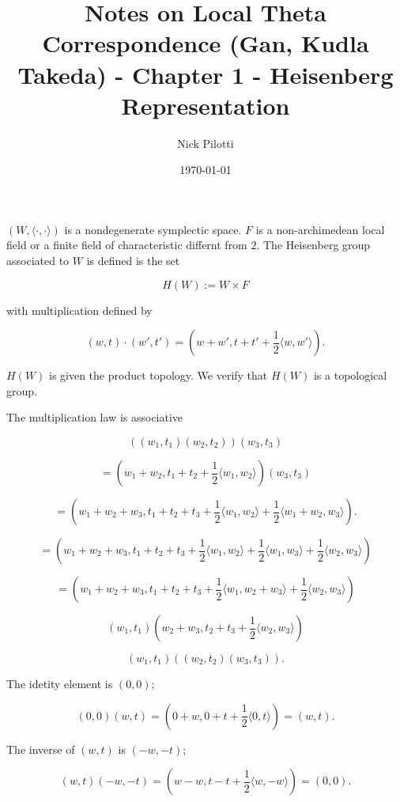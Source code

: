 \documentclass[12pt]{article}
\title{Notes on Local Theta Correspondence (Gan, Kudla Takeda) - Chapter 1 -
Heisenberg Representation}
\author{Nick Pilotti}
\date{\today}
\begin{document}
\maketitle

$\left(W, \langle \cdot, \cdot \rangle\right)$ is a nondegenerate symplectic
space. $F$ is a non-archimedean local field or a finite field of characteristic
differnt from $2$. The Heisenberg group associated to $W$ is defined is the set


\[H\left(W\right) := W \times F\]

with multiplication defined by 

\[\left(w, t\right) \cdot \left(w', t'\right) = \left(w + w', t + t' +
\frac{1}{2}\langle w, w' \rangle\right).\]

$H\left(W\right)$ is given the product topology. We verify that
$H\left(W\right)$ is a topological group.

The multiplication law is associative 

\[\left(\left(w_1, t_1\right) \left(w_2, t_2\right)\right) \left(w_3,
t_3\right)\]

\[= \left(w_1 + w_2, t_1 + t_2 + \frac{1}{2} \langle w_1, w_2 \rangle\right)
\left(w_3, t_3\right)\] 

\[= \left(w_1 + w_2 + w_3, t_1 + t_2 + t_3 + \frac{1}{2} \langle w_1, w_2
\rangle + \frac{1}{2} \langle w_1 + w_2, w_3 \rangle\right).\] 

\[= \left(w_1 + w_2 + w_3, t_1 + t_2 + t_3 + \frac{1}{2} \langle w_1, w_2
\rangle + \frac{1}{2} \langle w_1, w_3 \rangle + \frac{1}{2} \langle w_2, w_3
\rangle\right)\] 

\[= \left(w_1 + w_2 + w_3, t_1 + t_2 + t_3 + \frac{1}{2}\langle w_1, w_2 + w_3
\rangle + \frac{1}{2} \langle w_2, w_3 \rangle\right)\] 

\[\left(w_1, t_1\right) \left(w_2 + w_3, t_2 + t_3 + \frac{1}{2} \langle w_2,
w_3 \rangle\right)\] 

\[\left(w_1, t_1\right) \left( \left(w_2, t_2 \right) \left(w_3, t_3
\right)\right).\]

The idetity element is $\left(0, 0\right)$; 

\[\left(0, 0\right)\left(w, t\right) = \left(0 + w, 0 + t + \frac{1}{2} \langle
0, t \rangle\right) = \left(w, t\right).\]

The inverse of $\left(w, t\right)$ is $\left(-w, -t\right)$; 

\[\left(w, t\right) \left(-w, -t\right) = \left(w - w, t - t + \frac{1}{2}
\langle w, -w \rangle\right) = \left(0, 0\right).\]
\end{document}
